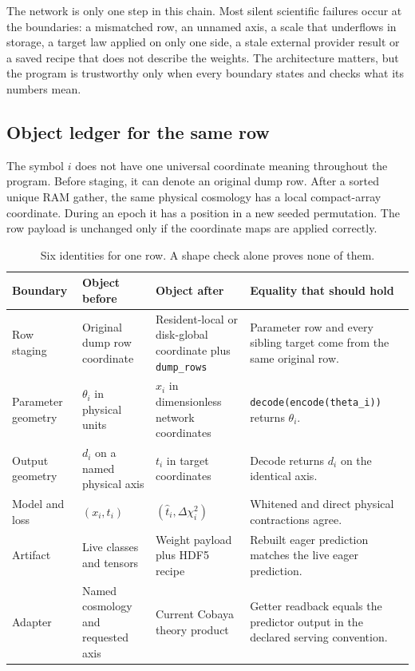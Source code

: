 \documentclass[10pt,aps,prd,twocolumn,nofootinbib]{revtex4-2}
\newcommand{\code}[1]{\texttt{#1}}
\begin{document}
The network is only one step in this chain.  Most silent scientific failures
occur at the boundaries: a mismatched row, an unnamed axis, a scale that
underflows in storage, a target law applied on only one side, a stale external
provider result or a saved recipe that does not describe the weights.  The
architecture matters, but the program is trustworthy only when every boundary
states and checks what its numbers mean.

\subsection{Object ledger for the same row}

The symbol $i$ does not have one universal coordinate meaning throughout the
program.  Before staging, it can denote an original dump row.  After a sorted
unique RAM gather, the same physical cosmology has a local compact-array
coordinate.  During an epoch it has a position in a new seeded permutation.
The row payload is unchanged only if the coordinate maps are applied
correctly.

\begin{table}[t]
\centering
\begin{tabular}{p{}p{}p{}p{}}
\toprule
Boundary & Object before & Object after & Equality that should hold \\
\midrule
Row staging & Original dump row coordinate & Resident-local or disk-global
coordinate plus \code{dump\_rows} & Parameter row and every sibling target
come from the same original row.  \\
Parameter geometry & $\theta_i$ in physical units & $x_i$ in dimensionless
network coordinates & \code{decode(encode(theta\_i))} returns $\theta_i$.  \\
Output geometry & $d_i$ on a named physical axis & $t_i$ in target coordinates
& Decode returns $d_i$ on the identical axis.  \\
Model and loss & $(x_i,t_i)$ & $(\widehat t_i,\Delta\chi_i^2)$ & Whitened and
direct physical contractions agree.  \\
Artifact & Live classes and tensors & Weight payload plus HDF5 recipe & Rebuilt
eager prediction matches the live eager prediction.  \\
Adapter & Named cosmology and requested axis & Current Cobaya theory product &
Getter readback equals the predictor output in the declared serving convention.  \\
\bottomrule
\end{tabular}
\caption{Six identities for one row.  A shape check alone proves none of
them.}
\end{table}
\end{document}
